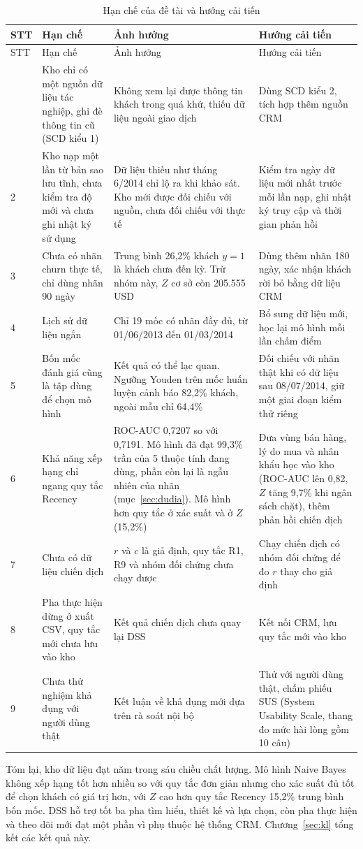 {\footnotesize
\begin{longtable}{p{0.6cm}p{4.2cm}p{5.0cm}p{4.2cm}}
\caption{Hạn chế của đề tài và hướng cải tiến}\label{tab:hanche}\\
\toprule
STT & Hạn chế & Ảnh hưởng & Hướng cải tiến \\
\midrule
\endfirsthead
\toprule
STT & Hạn chế & Ảnh hưởng & Hướng cải tiến \\
\midrule
\endhead
\bottomrule
\endlastfoot
1 & Kho chỉ có một nguồn dữ liệu tác nghiệp, ghi đè thông tin cũ (SCD kiểu 1) & Không xem lại được thông tin khách trong quá khứ, thiếu dữ liệu ngoài giao dịch & Dùng SCD kiểu 2, tích hợp thêm nguồn CRM \\
2 & Kho nạp một lần từ bản sao lưu tĩnh, chưa kiểm tra độ mới và chưa ghi nhật ký sử dụng & Dữ liệu thiếu như tháng 6/2014 chỉ lộ ra khi khảo sát. Kho mới được đối chiếu với nguồn, chưa đối chiếu với thực tế & Kiểm tra ngày dữ liệu mới nhất trước mỗi lần nạp, ghi nhật ký truy cập và thời gian phản hồi \\
3 & Chưa có nhãn churn thực tế, chỉ dùng nhãn 90 ngày & Trung bình 26,2\% khách $y=1$ là khách chưa đến kỳ. Trừ nhóm này, $Z$ cơ sở còn 205.555 USD & Dùng thêm nhãn 180 ngày, xác nhận khách rời bỏ bằng dữ liệu CRM \\
4 & Lịch sử dữ liệu ngắn & Chỉ 19 mốc có nhãn đầy đủ, từ 01/06/2013 đến 01/03/2014 & Bổ sung dữ liệu mới, học lại mô hình mỗi lần chấm điểm \\
5 & Bốn mốc đánh giá cũng là tập dùng để chọn mô hình & Kết quả có thể lạc quan. Ngưỡng Youden trên mốc huấn luyện cảnh báo 82,2\% khách, ngoài mẫu chỉ 64,4\% & Đối chiếu với nhãn thật khi có dữ liệu sau 08/07/2014, giữ một giai đoạn kiểm thử riêng \\
6 & Khả năng xếp hạng chỉ ngang quy tắc Recency & ROC-AUC 0,7207 so với 0,7191. Mô hình đã đạt 99,3\% trần của 5 thuộc tính đang dùng, phần còn lại là ngẫu nhiên của nhãn (mục~\ref{sec:dudia}). Mô hình hơn quy tắc ở xác suất và ở $Z$ (15,2\%) & Đưa vùng bán hàng, lý do mua và nhân khẩu học vào kho (ROC-AUC lên 0,82, $Z$ tăng 9,7\% khi ngân sách chặt), thêm phản hồi chiến dịch \\
7 & Chưa có dữ liệu chiến dịch & $r$ và $c$ là giả định, quy tắc R1, R9 và nhóm đối chứng chưa chạy được & Chạy chiến dịch có nhóm đối chứng để đo $r$ thay cho giả định \\
8 & Pha thực hiện dừng ở xuất CSV, quy tắc mới chưa lưu vào kho & Kết quả chiến dịch chưa quay lại DSS & Kết nối CRM, lưu quy tắc mới vào kho \\
9 & Chưa thử nghiệm khả dụng với người dùng thật & Kết luận về khả dụng mới dựa trên rà soát nội bộ & Thử với người dùng thật, chấm phiếu SUS (System Usability Scale, thang đo mức hài lòng gồm 10 câu) \\
\end{longtable}
}

Tóm lại, kho dữ liệu đạt năm trong sáu chiều chất lượng. Mô hình Naive Bayes không xếp hạng tốt hơn nhiều so với quy tắc đơn giản nhưng cho xác suất đủ tốt để chọn khách có giá trị hơn, với $Z$ cao hơn quy tắc Recency 15,2\% trung bình bốn mốc. DSS hỗ trợ tốt ba pha tìm hiểu, thiết kế và lựa chọn, còn pha thực hiện và theo dõi mới đạt một phần vì phụ thuộc hệ thống CRM. Chương~\ref{sec:kl} tổng kết các kết quả này.
